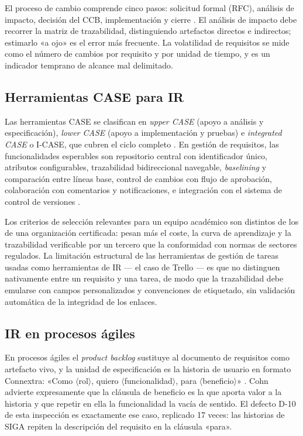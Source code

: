 \documentclass[11pt,letterpaper]{article}
\begin{document}
El proceso de cambio comprende cinco pasos: solicitud formal (RFC), análisis de impacto, decisión del CCB, implementación y cierre \cite{pmbok2021,wiegers2013}. El análisis de impacto debe recorrer la matriz de trazabilidad, distinguiendo artefactos directos e indirectos; estimarlo «a ojo» es el error más frecuente. La volatilidad de requisitos se mide como el número de cambios por requisito y por unidad de tiempo, y es un indicador temprano de alcance mal delimitado.

\subsection{Herramientas CASE para IR}
Las herramientas CASE se clasifican en \emph{upper CASE} (apoyo a análisis y especificación), \emph{lower CASE} (apoyo a implementación y pruebas) e \emph{integrated CASE} o I-CASE, que cubren el ciclo completo \cite{swebok2024}. En gestión de requisitos, las funcionalidades esperables son repositorio central con identificador único, atributos configurables, trazabilidad bidireccional navegable, \emph{baselining} y comparación entre líneas base, control de cambios con flujo de aprobación, colaboración con comentarios y notificaciones, e integración con el sistema de control de versiones \cite{pohl2025,wiegers2013}.

Los criterios de selección relevantes para un equipo académico son distintos de los de una organización certificada: pesan más el coste, la curva de aprendizaje y la trazabilidad verificable por un tercero que la conformidad con normas de sectores regulados. La limitación estructural de las herramientas de gestión de tareas usadas como herramientas de IR --- el caso de Trello --- es que no distinguen nativamente entre un requisito y una tarea, de modo que la trazabilidad debe emularse con campos personalizados y convenciones de etiquetado, sin validación automática de la integridad de los enlaces.

\subsection{IR en procesos ágiles}
En procesos ágiles el \emph{product backlog} sustituye al documento de requisitos como artefacto vivo, y la unidad de especificación es la historia de usuario en formato Connextra: «Como \(\langle\)rol\(\rangle\), quiero \(\langle\)funcionalidad\(\rangle\), para \(\langle\)beneficio\(\rangle\)» \cite{cohn2004}. Cohn advierte expresamente que la cláusula de beneficio es la que aporta valor a la historia y que repetir en ella la funcionalidad la vacía de sentido. El defecto D-10 de esta inspección es exactamente ese caso, replicado 17 veces: las historias de SIGA repiten la descripción del requisito en la cláusula «para».
\end{document}
